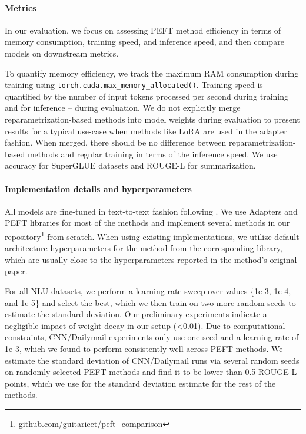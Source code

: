 \paragraph{Metrics}

In our evaluation, we focus on assessing PEFT method efficiency in terms of memory consumption, training speed, and inference speed, and then compare models on downstream metrics.

To quantify memory efficiency, we track the maximum RAM consumption during training using \texttt{torch.cuda.max\_memory\_allocated()}. Training speed is quantified by the number of input tokens processed per second during training and for inference -- during evaluation. We do not explicitly merge reparametrization-based methods into model weights during evaluation to present results for a typical use-case when methods like LoRA are used in the adapter fashion. When merged, there should be no difference between reparametrization-based methods and regular training in terms of the inference speed. We use accuracy for SuperGLUE datasets and ROUGE-L for summarization.

\paragraph{Implementation details and hyperparameters}

All models are fine-tuned in text-to-text fashion following \citet{t5}. We use Adapters and PEFT libraries \citep{adapters_library_v2,peft_libarry} for most of the methods and implement several methods in our repository\footnote{\href{http://github.com/guitaricet/peft_comparison}{github.com/guitaricet/peft\_comparison}} from scratch. When using existing implementations, we utilize default architecture hyperparameters for the method from the corresponding library, which are usually close to the hyperparameters reported in the method's original paper.

For all NLU datasets, we perform a learning rate sweep over values \{1e-3, 1e-4, and 1e-5\} and select the best, which we then train on two more random seeds to estimate the standard deviation. Our preliminary experiments indicate a negligible impact of weight decay in our setup (<0.01). Due to computational constraints, CNN/Dailymail experiments only use one seed and a learning rate of 1e-3, which we found to perform consistently well across PEFT methods. We estimate the standard deviation of CNN/Dailymail runs via several random seeds on randomly selected PEFT methods and find it to be lower than 0.5 ROUGE-L points, which we use for the standard deviation estimate for the rest of the methods.

